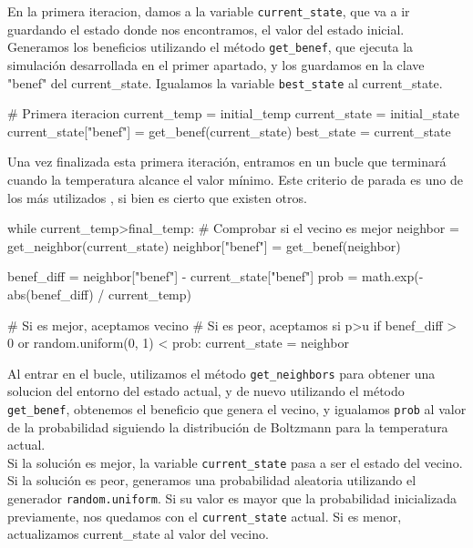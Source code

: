 \documentclass[a4paper,12pt]{article}
\begin{document}
	En la primera iteracion, damos a la variable \texttt{current\_state}, que va a ir guardando el estado donde nos encontramos, el valor del estado inicial.
	Generamos los beneficios utilizando el método \texttt{get\_benef}, que ejecuta la simulación desarrollada en el primer apartado, y los guardamos en la clave
	"benef" del current\_state. Igualamos la variable \texttt{best\_state} al current\_state.\\

	\begin{python}
	# Primera iteracion
	current_temp = initial_temp
	current_state = initial_state
	current_state["benef"] = get_benef(current_state)
	best_state = current_state
	\end{python}			

	Una vez finalizada esta primera iteración, entramos en un bucle que terminará cuando la temperatura alcance el valor mínimo. Este criterio de parada es uno de los más utilizados \cite{tfm}, si bien es cierto que existen otros.\\

	\begin{python}	
while current_temp>final_temp:
	# Comprobar si el vecino es mejor
	neighbor = get_neighbor(current_state)
	neighbor["benef"] = get_benef(neighbor)

	benef_diff = neighbor["benef"] - current_state["benef"]
	prob = math.exp(-abs(benef_diff) / current_temp)

	# Si es mejor, aceptamos vecino
	# Si es peor, aceptamos si p>u
	if benef_diff > 0 or random.uniform(0, 1) < prob:
		current_state = neighbor
	\end{python}	

	Al entrar en el bucle, utilizamos el método \texttt{get\_neighbors} para obtener una solucion del entorno del estado actual, y de nuevo utilizando el método \texttt{get\_benef}, obtenemos el beneficio que genera el vecino, y igualamos \texttt{prob} al valor de la probabilidad siguiendo la distribución de Boltzmann para la temperatura actual. \\
	
	Si la solución es mejor, la variable \texttt{current\_state} pasa a ser el estado del vecino.
	Si la solución es peor, generamos una probabilidad aleatoria utilizando el generador \texttt{random.uniform}. Si su valor es mayor que la probabilidad inicializada previamente,
	nos quedamos con el \texttt{current\_state} actual. Si es menor, actualizamos current\_state al valor del vecino.\\
\end{document}
